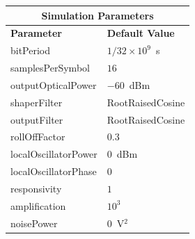 \begin{refsection}
\begin{table}[H]
	\begin{tabular}{|l|l|}
		\hline
		\multicolumn{2}{|c|}{ \textbf{Simulation Parameters} } \\
		\hline
		\textbf{Parameter}     & \textbf{Default Value}                                     \\\hline
		bitPeriod              & $1/32\times10^9$~s														\\\hline
		samplesPerSymbol       & $16$                                                       \\\hline
		outputOpticalPower     & $-60$~dBm 													\\ \hline
		shaperFilter	       & RootRaisedCosine												\\ \hline
		outputFilter		   & RootRaisedCosine												\\ \hline
		rollOffFactor		   & 0.3														\\ \hline
		localOscillatorPower   & $0$~dBm                                                    \\ \hline
		localOscillatorPhase   & $0$                                                        \\ \hline
		responsivity           & $1$                                                        \\ \hline
		amplification          & $10^3$                                                     \\ \hline
		noisePower   & $0$~V$^2$                             					\\ \hline

\end{tabular}
\end{table}
\end{refsection}
